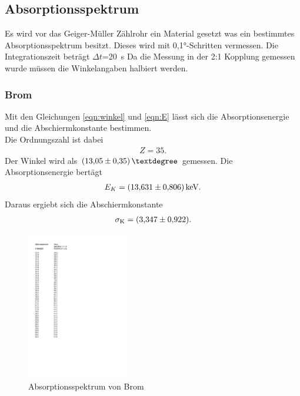 \FloatBarrier

\subsection{Absorptionsspektrum}
Es wird vor das Geiger-Müller Zählrohr ein Material gesetzt was ein bestimmtes Absorptionsspektrum besitzt.
Dieses wird mit 0,1°-Schritten vermessen. Die Integrationszeit beträgt $\Delta t$=\SI{20}{s}
Da die Messung in der 2:1 Kopplung gemessen wurde müssen die Winkelangaben halbiert werden.
\subsubsection{Brom}
Mit den Gleichungen \ref{eqn:winkel} und  \ref{eqn:E} lässt sich die Absorptionsenergie und die Abschiermkonstante bestimmen.\\
 Die Ordnungszahl ist dabei
\begin{align*}
  Z=35.
\end{align*}
Der Winkel wird als $\SI{13,05\pm0,35}{°}$ gemessen.
Die Absorptionsenergie bertägt
\begin{align*}
  E_K=\SI{13,631\pm0,806}{keV}.
\end{align*}
Daraus ergiebt sich die Abschiermkonstante
\begin{align*}
  \sigma_{\text{K}}=\SI{3,347\pm0,922}{}.
\end{align*}
\begin{figure}[h!]
  \centering
  \includegraphics[width=0.4\textwidth]{bromtab.pdf}
  \caption{Absorptionsspektrum von Brom}
  \label{tab:brom}
\end{figure}
